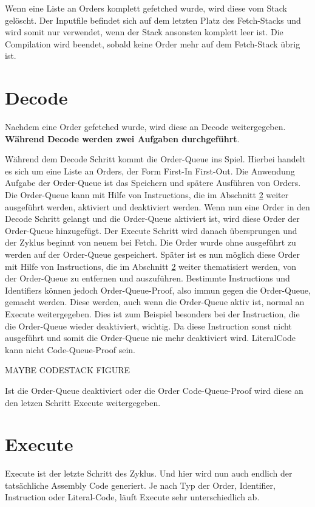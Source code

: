 Wenn eine Liste an Orders komplett gefetched wurde, wird diese vom Stack gelöscht. Der Inputfile befindet sich auf dem letzten Platz des Fetch-Stacks und wird somit nur verwendet, wenn der Stack ansonsten komplett leer ist.
Die Compilation wird beendet, sobald keine Order mehr auf dem Fetch-Stack übrig ist.

\section{Decode} \label{sec:qhs-decode}
Nachdem eine Order gefetched wurde, wird diese an Decode weitergegeben. \textbf{Während Decode werden zwei Aufgaben durchgeführt}.

Während dem Decode Schritt kommt die Order-Queue ins Spiel. Hierbei handelt es sich um eine Liste an Orders, der Form First-In First-Out. Die Anwendung Aufgabe der Order-Queue ist das Speichern und spätere Ausführen von Orders.
Die Order-Queue kann mit Hilfe von Instructions, die im Abschnitt \ref{sec:qhs-execute} weiter ausgeführt werden, aktiviert und deaktiviert werden. Wenn nun eine Order in den Decode Schritt gelangt und die Order-Queue aktiviert ist,
wird diese Order der Order-Queue hinzugefügt. Der Execute Schritt wird danach übersprungen und der Zyklus beginnt von neuem bei Fetch. Die Order wurde ohne ausgeführt zu werden auf der Order-Queue gespeichert.
Später ist es nun möglich diese Order mit Hilfe von Instructions, die im Abschnitt \ref{sec:qhs-execute} weiter thematisiert werden, von der Order-Queue zu entfernen und auszuführen.
Bestimmte Instructions und Identifiers können jedoch Order-Queue-Proof, also immun gegen die Order-Queue, gemacht werden. Diese werden, auch wenn die Order-Queue aktiv ist, normal an Execute weitergegeben.
Dies ist zum Beispiel besonders bei der Instruction, die die Order-Queue wieder deaktiviert, wichtig. Da diese Instruction sonst nicht ausgeführt und somit die Order-Queue nie mehr deaktiviert wird.
LiteralCode kann nicht Code-Queue-Proof sein.

MAYBE CODESTACK FIGURE

Ist die Order-Queue deaktiviert oder die Order Code-Queue-Proof wird diese an den letzen Schritt Execute weitergegeben.

\section{Execute} \label{sec:qhs-execute}
Execute ist der letzte Schritt des Zyklus. Und hier wird nun auch endlich der tatsächliche Assembly Code generiert. Je nach Typ der Order, Identifier, Instruction oder Literal-Code, läuft Execute sehr unterschiedlich ab.

